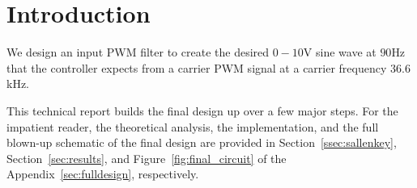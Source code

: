 \section{Introduction}
\label{sec:intro}

We design an input PWM filter to create the desired $0-10$\unit{\volt} sine wave
at $90$\unit{\hertz} that the controller expects from a carrier PWM signal at a
carrier frequency $36.6$\unit{\kilo\hertz}. 

This technical report builds the final design up over a few major steps. For the
impatient reader, the theoretical analysis, the implementation, and the full
blown-up schematic of the final design are provided in
Section~\ref{ssec:sallenkey}, Section~\ref{sec:results}, and
Figure~\ref{fig:final_circuit} of the Appendix~\ref{sec:fulldesign},
respectively.
